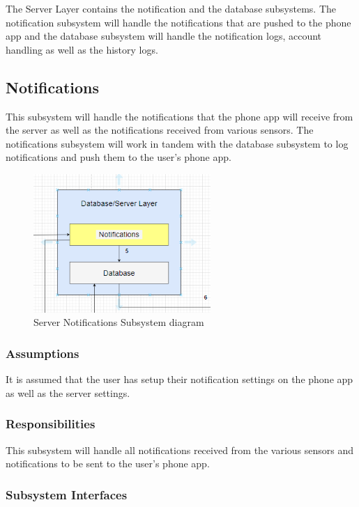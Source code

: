 
The Server Layer contains the notification and the database subsystems. The notification subsystem will handle the notifications that are pushed to the phone app and the database subsystem will handle the notification logs, account handling as well as the history logs. 

\subsection{Notifications}
This subsystem will handle the notifications that the phone app will receive from the server as well as the notifications received from various sensors. The notifications subsystem will work in tandem with the database subsystem to log notifications and push them to the user's phone app.

\begin{figure}[h!]
	\centering
 	\includegraphics[width=0.60\textwidth]{images/Server_Layer1}
 \caption{Server Notifications Subsystem diagram}
\end{figure}

\subsubsection{Assumptions}
It is assumed that the user has setup their notification settings on the phone app as well as the server settings. 

\subsubsection{Responsibilities}
This subsystem will handle all notifications received from the various sensors and notifications to be sent to the user's phone app. 

\subsubsection{Subsystem Interfaces}

